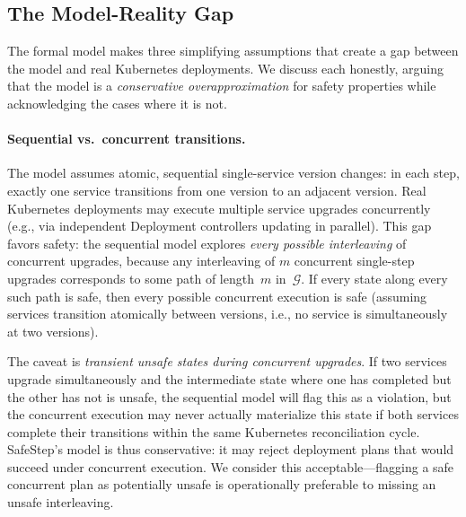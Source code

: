 \documentclass[10pt,twocolumn]{article}
\begin{document}
\subsection{The Model-Reality Gap}
\label{sec:formal:gap}

The formal model makes three simplifying assumptions that create a gap
between the model and real Kubernetes deployments.  We discuss each
honestly, arguing that the model is a \emph{conservative
overapproximation} for safety properties while acknowledging the cases
where it is not.

\paragraph{Sequential vs.\ concurrent transitions.}
The model assumes atomic, sequential single-service version changes: in
each step, exactly one service transitions from one version to an adjacent
version.  Real Kubernetes deployments may execute multiple service upgrades
concurrently (e.g., via independent Deployment controllers updating in
parallel).  This gap favors safety: the sequential model explores
\emph{every possible interleaving} of concurrent upgrades, because any
interleaving of $m$ concurrent single-step upgrades corresponds to some
path of length~$m$ in~$\mathcal{G}$.  If every state along every such path
is safe, then every possible concurrent execution is safe (assuming
services transition atomically between versions, i.e., no service is
simultaneously at two versions).

The caveat is \emph{transient unsafe states during concurrent upgrades}.
If two services upgrade simultaneously and the intermediate state where
one has completed but the other has not is unsafe, the sequential model
will flag this as a violation, but the concurrent execution may never
actually materialize this state if both services complete their transitions
within the same Kubernetes reconciliation cycle.  SafeStep's model is thus
conservative: it may reject deployment plans that would succeed under
concurrent execution.  We consider this acceptable---flagging a safe
concurrent plan as potentially unsafe is operationally preferable to
missing an unsafe interleaving.
\end{document}
